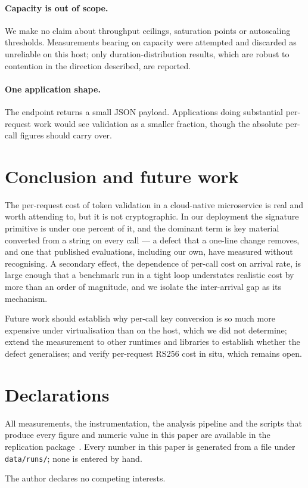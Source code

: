 \documentclass[pdflatex,sn-basic,twocolumn]{sn-jnl}
\begin{document}
\paragraph{Capacity is out of scope.} We make no claim about throughput
ceilings, saturation points or autoscaling thresholds. Measurements bearing on
capacity were attempted and discarded as unreliable on this host; only
duration-distribution results, which are robust to contention in the direction
described, are reported.

\paragraph{One application shape.} The endpoint returns a small JSON payload.
Applications doing substantial per-request work would see validation as a
smaller fraction, though the absolute per-call figures should carry over.

\section{Conclusion and future work}\label{sec:conclusion}

The per-request cost of token validation in a cloud-native microservice is real
and worth attending to, but it is not cryptographic. In our deployment the
signature primitive is under one percent of it, and the dominant term is key
material converted from a string on every call --- a defect that a one-line
change removes, and one that published evaluations, including our own, have
measured without recognising. A secondary effect, the dependence of per-call
cost on arrival rate, is large enough that a benchmark run in a tight loop
understates realistic cost by more than an order of magnitude, and we isolate the
inter-arrival gap as its mechanism.

Future work should establish why per-call key conversion is so much more
expensive under virtualisation than on the host, which we did not determine;
extend the measurement to other runtimes and libraries to establish whether the
defect generalises; and verify per-request RS256 cost in situ, which remains
open.

\section*{Declarations}

 All measurements, the instrumentation, the
analysis pipeline and the scripts that produce every figure and numeric value in
this paper are available in the replication package~\cite{psaoartifact2026}.
Every number in this paper is generated from a file under \texttt{data/runs/};
none is entered by hand.

 The author declares no competing interests.


\end{document}
